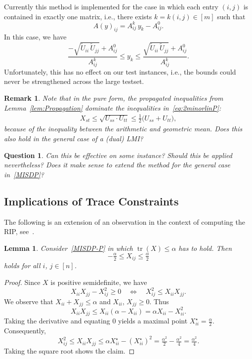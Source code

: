 \documentclass[10pt, a4paper]{article}
\DeclareMathOperator{\tr}{tr}
\newtheorem{lemma}[theorem]{Lemma}
\newtheorem{question}[theorem]{Question}
\newtheorem{remark}[theorem]{Remark}
\begin{document}
Currently this method is implemented for the case in which each entry
$(i,j)$ is contained in exactly one matrix, i.e., there exists
$k = k(i,j) \in [m]$ such that
\[
  A(y)_{ij} = A^k_{ij}\, y_k - A^0_{ij}.
\]
In this case, we have
\[
  \frac{-\sqrt{\tilde{U}_{ii}\,\tilde{U}_{jj}} + A^0_{ij}}{A^k_{ij}} \leq y_k \leq
  \frac{\sqrt{\tilde{U}_{ii}\,\tilde{U}_{jj}} + A^0_{ij}}{A^k_{ij}}.
\]
Unfortunately, this has no effect on our test instances, i.e., the bounds
could never be strengthened across the large testset.

\begin{remark}
  Note that in the pure form, the propagated inequalities from
  Lemma~\ref{lem:Propagation} dominate the inequalities
  in~\eqref{eq:2minorlinP}:
  \begin{align*}
    X_{st} \leq \sqrt{U_{ss} \cdot U_{tt}} \leq \frac{1}{2}\big( U_{ss} + U_{tt}\big),
  \end{align*}
  because of the inequality between the arithmetic and geometric mean. Does
  this also hold in the general case of a (dual) LMI?
\end{remark}

\begin{question}
  Can this be effective on some instance? Should this be applied
  nevertheless? Does it make sense to extend the method for the general
  case in~\eqref{MISDP}?
\end{question}

\subsection{Implications of Trace Constraints}

The following is an extension of an observation in the context of computing
the RIP, see~\cite{GalP16}.

\begin{lemma}
  Consider~\eqref{MISDP-P} in which $\tr(X) \leq \alpha$ has to hold. Then
  \[
    -\tfrac{\alpha}{2} \leq X_{ij} \leq \tfrac{\alpha}{2}
  \]
  holds for all $i$, $j \in [n]$.
\end{lemma}

\begin{proof}
  Since $X$ is positive semidefinite, we have
  \[
    X_{ii} X_{jj} - X_{ij}^2 \geq 0
    \quad\Leftrightarrow\quad
    X_{ij}^2 \leq X_{ii} X_{jj}.
  \]
  We observe that $X_{ii} + X_{jj} \leq \alpha$ and $X_{ii}$,
  $X_{jj} \geq 0$. Thus
  \[
    X_{ii} X_{jj} \leq X_{ii} (\alpha - X_{ii}) = \alpha X_{ii} - X_{ii}^2.
  \]
  Taking the derivative and equating 0 yields a maximal point
  $X_{ii}^\star = \tfrac{\alpha}{2}$. Consequently,
  \[
    X_{ij}^2 \leq X_{ii} X_{jj} \leq \alpha X_{ii}^\star - (X_{ii}^\star)^2 =
    \tfrac{\alpha^2}{2} - \tfrac{\alpha^2}{4} = \tfrac{\alpha^2}{4}.
  \]
  Taking the square root shows the claim.
\end{proof}
\end{document}
